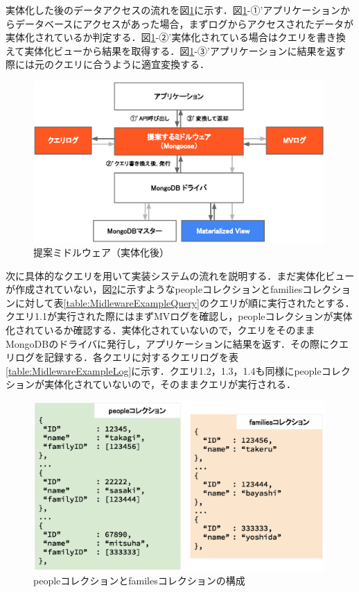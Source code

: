 \documentclass[a4paper,11pt]{ujreport}
\begin{document}
実体化した後のデータアクセスの流れを図\ref{figure:MidlewareMv}に示す．図\ref{figure:MidlewareMv}-①’アプリケーションからデータベースにアクセスがあった場合，まずログからアクセスされたデータが実体化されているか判定する．図\ref{figure:MidlewareMv}-②’実体化されている場合はクエリを書き換えて実体化ビューから結果を取得する．図\ref{figure:MidlewareMv}-③’アプリケーションに結果を返す際には元のクエリに合うように適宜変換する．
\begin{figure}[htbp]
	\begin{center}
		\includegraphics[width=30em]{src/MidlewareMv.eps} %
	\end{center}
	\caption{提案ミドルウェア（実体化後）}
	\label{figure:MidlewareMv}
\end{figure}

次に具体的なクエリを用いて実装システムの流れを説明する．まだ実体化ビューが作成されていない，図\ref{figure:MidlewareExampleCollections}に示すようなpeopleコレクションとfamiliesコレクションに対して表\ref{table:MidlewareExampleQuery}のクエリが順に実行されたとする．クエリ1.1が実行された際にはまずMVログを確認し，peopleコレクションが実体化されているか確認する．実体化されていないので，クエリをそのままMongoDBのドライバに発行し，アプリケーションに結果を返す．その際にクエリログを記録する．各クエリに対するクエリログを表\ref{table:MidlewareExampleLog}に示す．クエリ1.2，1.3，1.4も同様にpeopleコレクションが実体化されていないので，そのままクエリが実行される．

\begin{figure}[htbp]
	\begin{center}
		\includegraphics[width=30em, trim=0 10em 0 0]{src/MidlewareExampleCollections.eps} %
	\end{center}
	\caption{peopleコレクションとfamilesコレクションの構成}
	\label{figure:MidlewareExampleCollections}
\end{figure}
\end{document}
